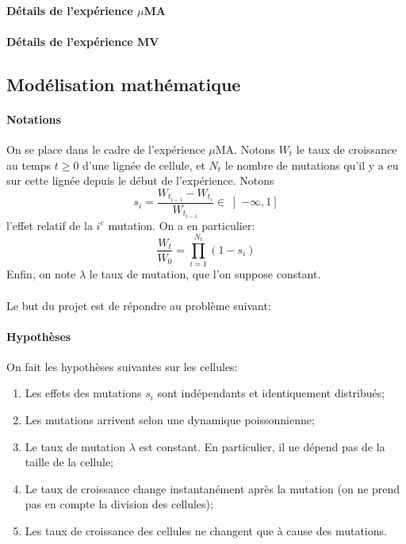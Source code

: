 \documentclass[12pt]{article}
\newcommand{\iof}[1]{\left]#1\right]}
\begin{document}
\paragraph{Détails de l'expérience $\mu$MA}

\paragraph{Détails de l'expérience MV}


\subsection{Modélisation mathématique}

\paragraph{Notations}
On se place dans le cadre de l'expérience $\mu$MA. Notons $W_t$ le taux de croissance au temps $t\geqslant 0$ d'une lignée de cellule, et $N_t$ le nombre de mutations qu'il y a eu sur cette lignée depuis le début de l'expérience. Notons \[s_i=\frac{W_{t_{i-1}}-W_{t_i}}{W_{t_{i-1}}}\in\iof{-\infty,1}\] l'effet relatif de la $i^e$ mutation. On a en particulier: 
\begin{equation}\label{mod}
  \frac{W_t}{W_0}=\prod_{i=1}^{N_t}(1-s_i)
\end{equation}
Enfin, on note $\lambda$ le taux de mutation, que l'on suppose constant.

\paragraph{}Le but du projet est de répondre au problème suivant:



\paragraph{Hypothèses}
On fait les hypothèses suivantes sur les cellules:
\begin{enumerate}
\item Les effets des mutations $s_i$ sont indépendants et identiquement distribués;
\item Les mutations arrivent selon une dynamique poissonnienne;
\item Le taux de mutation $\lambda$ est constant. En particulier, il ne dépend pas de la taille de la cellule;
\item Le taux de croissance change instantanément après la mutation (on ne prend pas en compte la division des cellules);
\item Les taux de croissance des cellules ne changent que à cause des mutations.
\end{enumerate}
\end{document}
